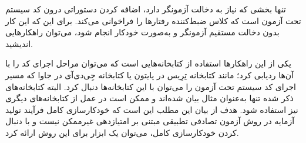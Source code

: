 تنها بخشی که نیاز به دخالت آزمونگر دارد، اضافه کردن دستوراتی درون کد سیستم تحت آزمون است که کلاس ضبط‌کننده رفتارها را فراخوانی می‌کند. برای این که این کار بدون دخالت مستقیم آزمونگر و به‌صورت خودکار انجام شود، می‌توان راهکارهایی اندیشید.

یکی از این راهکارها استفاده از کتابخانه‌هایی است که می‌توان مراحل اجرای کد را با آن‌ها ردیابی کرد؛ مانند کتابخانه تِرِیس
در پایتون یا کتابخانه جِی‌دی‌آی
 در جاوا که مسیر اجرای کد سیستم تحت آزمون را می‌توان با این کتابخانه‌ها دنبال کرد. البته کتابخانه‌های ذکر شده تنها به‌عنوان مثال بیان شده‌اند و ممکن است در عمل از کتابخانه‌های دیگری نیز استفاده شود. هدف از بیان این مطلب این است که خودکارسازی کامل فرآیند تولید آزمایه در روش آزمون تصادفی تطبیقی مبتنی بر امتیازدهی غیرممکن نیست و با دنبال کردن خودکارسازی کامل، می‌توان یک ابزار برای این روش ارائه کرد.



